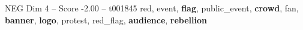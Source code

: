 \begin{textsample}{NEG Dim 4 – Score -2.00 – t001845}  \label{ex:f4_neg_011}
red, event, \textbf{flag}, public\_event, \textbf{crowd}, fan, \textbf{banner}, \textbf{logo}, protest, red\_flag, \textbf{audience}, \textbf{rebellion}

\end{textsample}
